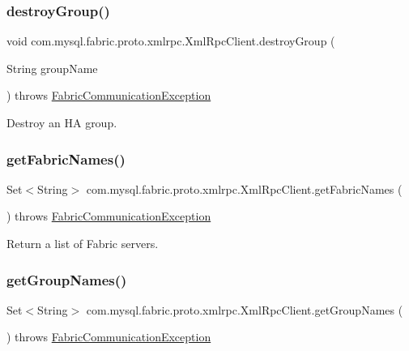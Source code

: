 \subsubsection{\texorpdfstring{destroy\+Group()}{destroyGroup()}}
{\footnotesize\ttfamily void com.\+mysql.\+fabric.\+proto.\+xmlrpc.\+Xml\+Rpc\+Client.\+destroy\+Group (\begin{DoxyParamCaption}\item[{String}]{group\+Name }\end{DoxyParamCaption}) throws \mbox{\hyperlink{classcom_1_1mysql_1_1fabric_1_1_fabric_communication_exception}{Fabric\+Communication\+Exception}}}

Destroy an HA group. \mbox{\label{classcom_1_1mysql_1_1fabric_1_1proto_1_1xmlrpc_1_1_xml_rpc_client_a61a79c49069ab6e664bbca2f37fe7813}} 
\subsubsection{\texorpdfstring{get\+Fabric\+Names()}{getFabricNames()}}
{\footnotesize\ttfamily Set$<$String$>$ com.\+mysql.\+fabric.\+proto.\+xmlrpc.\+Xml\+Rpc\+Client.\+get\+Fabric\+Names (\begin{DoxyParamCaption}{ }\end{DoxyParamCaption}) throws \mbox{\hyperlink{classcom_1_1mysql_1_1fabric_1_1_fabric_communication_exception}{Fabric\+Communication\+Exception}}}

Return a list of Fabric servers. \mbox{\label{classcom_1_1mysql_1_1fabric_1_1proto_1_1xmlrpc_1_1_xml_rpc_client_a553477c453b6790f351a0b0b21bf5947}} 
\subsubsection{\texorpdfstring{get\+Group\+Names()}{getGroupNames()}}
{\footnotesize\ttfamily Set$<$String$>$ com.\+mysql.\+fabric.\+proto.\+xmlrpc.\+Xml\+Rpc\+Client.\+get\+Group\+Names (\begin{DoxyParamCaption}{ }\end{DoxyParamCaption}) throws \mbox{\hyperlink{classcom_1_1mysql_1_1fabric_1_1_fabric_communication_exception}{Fabric\+Communication\+Exception}}}

